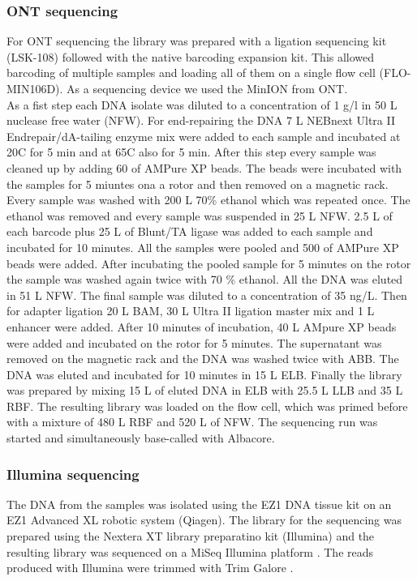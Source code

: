 \subsubsection{ONT sequencing}
For ONT sequencing the library was prepared with a ligation sequencing kit (LSK-108) followed with the native barcoding expansion kit. This allowed barcoding of multiple samples and loading all of them on a single flow cell (FLO-MIN106D). As a sequencing device we used the MinION from ONT. \\
As a fist step each DNA isolate was diluted to a concentration of 1 \textmu g/\textmu l in 50 \textmu L nuclease free water (NFW). For end-repairing the DNA 7 \textmu L NEBnext Ultra II Endrepair/dA-tailing enzyme mix were added to each
sample and incubated at 20\degree C for 5 min and at 65\degree C also for 5 min. After this step every sample was cleaned up by adding 60 \textmu of AMPure XP beads. The beads were incubated with the samples for 5 miuntes ona a rotor and then removed on a magnetic rack. Every sample was washed with 200 \textmu L 70\% ethanol which was repeated once. The ethanol was removed and every sample was suspended in 25 \textmu L NFW. 2.5 \textmu L of each barcode plus 25 \textmu L of Blunt/TA ligase was added to each sample and incubated for 10 minutes. All the samples were pooled and 500 \textmu of AMPure XP beads were added. After incubating the pooled sample for 5 minutes on the rotor the sample was washed again twice with 70 \% ethanol. All the DNA was eluted in 51 \textmu L NFW. The final sample was diluted to a concentration of 35 ng/\textmu L. Then for adapter ligation 20 \textmu L BAM, 30 \textmu L Ultra II ligation master mix and 1 \textmu L enhancer were added. After 10 minutes of incubation, 40 \textmu L AMpure XP beads were added and incubated on the rotor for 5 minutes. The supernatant was removed on the magnetic rack and the DNA was washed twice with ABB. The DNA was eluted and incubated for 10 minutes in 15 \textmu L ELB. Finally the library was prepared by mixing 15 \textmu L of eluted DNA in ELB with 25.5 \textmu L LLB and 35 \textmu L RBF. The resulting library was loaded on the flow cell, which was primed before with a mixture of 480 \textmu L RBF  and 520 \textmu L of NFW. The sequencing run was started and simultaneously base-called with Albacore.

\subsubsection{Illumina sequencing}
The DNA from the samples was isolated using the EZ1 DNA tissue kit on an EZ1 Advanced XL robotic system (Qiagen). The library for the sequencing was prepared using the Nextera XT library preparatino kit (Illumina) and the resulting library was sequenced on a MiSeq Illumina platform \cite{nanopore}. The reads produced with Illumina were trimmed with Trim Galore \cite{noauthor_babraham_nodate}.
\label{section:illumina}

